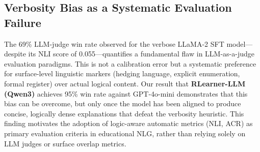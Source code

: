 \subsection{Verbosity Bias as a Systematic Evaluation Failure}

The 69\% LLM-judge win rate observed for the verbose LLaMA-2 SFT model---despite its NLI score of 0.055---quantifies a fundamental flaw in LLM-as-a-judge evaluation paradigms. This is not a calibration error but a systematic preference for surface-level linguistic markers (hedging language, explicit enumeration, formal register) over actual logical content. Our result that \textbf{RLearner-LLM (Qwen3)} achieves 95\% win rate against GPT-4o-mini demonstrates that this bias can be overcome, but only once the model has been aligned to produce concise, logically dense explanations that defeat the verbosity heuristic. This finding motivates the adoption of logic-aware automatic metrics (NLI, ACR) as primary evaluation criteria in educational NLG, rather than relying solely on LLM judges or surface overlap metrics.
